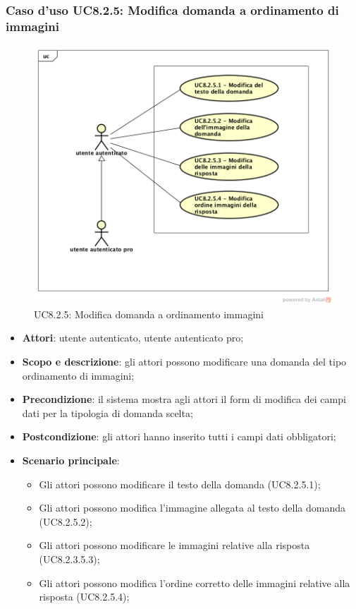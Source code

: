 \subsubsection{Caso d’uso UC8.2.5: Modifica domanda a ordinamento di immagini}
\label{UC8.2.5}
	\begin{figure}[h]
		\centering
			\includegraphics[scale=0.45,keepaspectratio]{UML/UC8_2_5-1.png}
		\caption{UC8.2.5: Modifica domanda a ordinamento immagini}
	\end{figure}
\begin{itemize}
	\item\textbf{Attori}: utente autenticato, utente autenticato pro;
	\item\textbf{Scopo e descrizione}: gli attori possono modificare una domanda del tipo ordinamento di immagini;
	\item\textbf{Precondizione}: il sistema mostra agli attori il form di modifica dei campi dati per la tipologia di domanda scelta; 
	\item \textbf{Postcondizione}: gli attori hanno inserito tutti i campi dati obbligatori;
	\item\textbf{Scenario principale}: 
	\begin{itemize}
		\item Gli attori possono modificare il testo della domanda (UC8.2.5.1);
		\item Gli attori possono modifica l'immagine allegata al testo della domanda (UC8.2.5.2);
		\item Gli attori possono modificare le immagini relative alla risposta (UC8.2.3.5.3);
		\item Gli attori possono modifica l'ordine corretto delle immagini relative alla risposta (UC8.2.5.4);
	\end{itemize}
\end{itemize}

